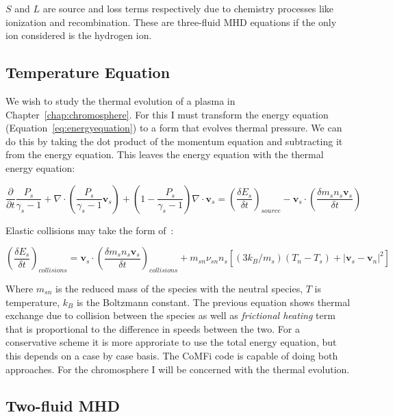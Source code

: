 \documentclass[12pt,upcase]{umlthesis}
\begin{document}
$S$ and $L$ are source and loss terms respectively due to chemistry processes like ionization and recombination. These are three-fluid MHD equations if the only ion considered is the hydrogen ion.

\subsection{Temperature Equation}

We wish to study the thermal evolution of a plasma in Chapter~\ref{chap:chromosphere}. For this I must transform the energy equation (Equation~\ref{eq:energyequation}) to a form that evolves thermal pressure. We can do this by taking the dot product of the momentum equation and subtracting it from the energy equation. This leaves the energy equation with the thermal energy equation:

\begin{equation}\label{eq:pressureequation}
	\frac{\partial }{\partial t}\frac{P_s}{\gamma_s - 1} +\nabla\cdot(\frac{P_s}{\gamma_s -1}\textbf{v}_s) + (1 - \frac{P_s}{\gamma_s - 1}) \nabla\cdot\textbf{v}_s = {(\frac{\delta E_s}{\delta t})}_{source} - \textbf{v}_s \cdot(\frac{\delta m_s n_s\textbf{v}_s}{\delta t})
\end{equation}

Elastic collisions may take the form of~\citep{Banks1973}:

\begin{equation}\label{eq:energycollisions}
	{(\frac{\delta E_s}{\delta t})}_{collisions} = \textbf{v}_s \cdot {(\frac{\delta m_s n_s \textbf{v}_s}{\delta t})}_{collisions} + m_{sn} \nu_{sn} n_s [ (3 k_B / m_s) (T_n - T_s) + \lvert \textbf{v}_s - \textbf{v}_n \rvert^2 ]
\end{equation}

Where $m_{sn}$ is the reduced mass of the species with the neutral species, $T$ is temperature, $k_B$ is the Boltzmann constant. The previous equation shows thermal exchange due to collision between the species as well as {\it frictional heating\/} term that is proportional to the difference in speeds between the two. For a conservative scheme it is more approriate to use the total energy equation, but this depends on a case by case basis. The CoMFi code is capable of doing both approaches. For the chromosphere I will be concerned with the thermal evolution.

\subsection{Two-fluid MHD}\label{sec:2fluidmhd}
\end{document}
